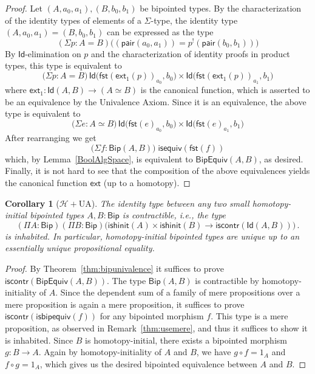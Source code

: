 \documentclass[reqno,10pt,a4paper,oneside]{amsart}
\numberwithin{equation}{section}
\theoremstyle{mythm}
\newtheorem{corollary}[theorem]{Corollary}
\theoremstyle{mydef}
\theoremstyle{myrmk}
\newcommand{\co}{\colon}
\newcommand{\comp}{\circ}
\newcommand{\Hint}{\mathcal{H}}
\newcommand{\iscontr}{\mathsf{iscontr}}
\newcommand{\isequiv}{\mathsf{isequiv}}
\newcommand{\ext}{\mathsf{ext}}
\newcommand{\pair}{\mathsf{pair}}
\newcommand{\fst}{\mathsf{fst}}
\newcommand{\Id}{\mathsf{Id}}
\newcommand{\Bip}{\mathsf{Bip}}
\newcommand{\BipHom}{\mathsf{Bip}}
\newcommand{\isbipequiv}{\mathsf{isbipequiv}}
\newcommand{\BipEquiv}{\mathsf{BipEquiv}}
\newcommand{\ishinitial}{\mathsf{ishinit}}
\begin{document}
\begin{proof} 
Let $ (A,a_0,a_1), (B,b_0,b_1)$ be bipointed types. By the characterization of the identity types
of  elements of a $\Sigma$-type, the 
identity type $(A,a_0,a_1) = (B,b_0,b_1)$ can be expressed as the type
\[(\Sigma p : A = B) \big((\pair(a_0,a_1)) = p^{!}(\pair(b_0,b_1)) \big)\]
By $\Id$-elimination on $p$ and the characterization of identity proofs in product types, this type is equivalent to
\[ \big(\Sigma p : A = B \big) \, \Id \big(\fst(\ext_1(p))_{a_0},  b_0\big) \times \Id \big( \fst(\ext_1(p))_{a_1} , b_1\big) \]
where $\ext_1 \co \Id(A,B) \to (A \simeq B)$ is the canonical function, which is asserted to be an equivalence by the
Univalence Axiom. Since it is an equivalence, the above type is equivalent to
\[ \big(\Sigma e : A \simeq B \big) \, \Id \big(\fst(e)_{a_0},  b_0\big) \times \Id \big( \fst(e)_{a_1} , b_1\big) \]
After rearranging we get
\[
 \big(\Sigma f \co \BipHom(A,B)\big) \; \isequiv(\fst(f))
\]
which, by Lemma~\ref{BoolAlgSpace}, is equivalent to $\BipEquiv(A,B)$, as desired. Finally, it is not hard to see that the composition of the above equivalences yields the canonical function $\ext$ (up to a homotopy).
\end{proof} 

\begin{corollary}[$\Hint + \mathrm{UA}$] \label{BoolHInitIso}
The identity type between any two small homotopy-initial bipointed types $A,B : \Bip$ is contractible, i.e., the type
\[ 
(\Pi A \co \Bip)(\Pi B \co \Bip) 
\big( \ishinitial(A) \times \ishinitial(B) \to \iscontr(\Id(A,B)) \big) \, .
\] 
is inhabited. In particular, homotopy-initial bipointed types are unique up to an essentially unique
propositional equality.
\end{corollary}

\begin{proof}
By Theorem~\ref{thm:bipunivalence} it suffices to prove $\iscontr(\BipEquiv(A,B))$. The type 
$\BipHom( A, B)$ is contractible by homotopy-initiality of $A$. Since the dependent sum of a family of mere propositions over a mere proposition is again a mere proposition, it suffices to prove $\iscontr(\isbipequiv(f))$ for any bipointed morphism $f$. This type is a mere proposition, as observed in Remark~\ref{thm:usemere}, and thus it suffices to show it is inhabited.
Since $B$ is homotopy-initial, there exists a bipointed morphism $g : B \to A$. Again by homotopy-initiality of $A$ and $B$, we have $g \comp f = 1_A$ and~$f \comp g = 1_A$, which gives us the desired bipointed equivalence between $A$ and $B$.
\end{proof}
\end{document}
